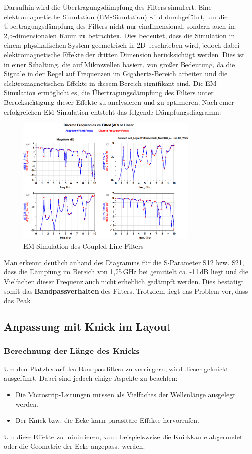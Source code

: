 Daraufhin wird die Übertragungsdämpfung des Filters simuliert. Eine elektromagnetische Simulation (EM-Simulation) wird durchgeführt, um die Übertragungsdämpfung des Filters nicht nur eindimensional, sondern auch im 2,5-dimensionalen Raum zu betrachten. 
Dies bedeutet, dass die Simulation in einem physikalischen System geometrisch in 2D beschrieben wird, jedoch dabei elektromagnetische Effekte der dritten Dimension berücksichtigt werden. 
Dies ist in einer Schaltung, die auf Mikrowellen basiert, von großer Bedeutung, da die Signale in der Regel auf Frequenzen im Gigahertz-Bereich arbeiten und die elektromagnetischen Effekte in diesem Bereich signifikant sind. 
Die EM-Simulation ermöglicht es, die Übertragungsdämpfung des Filters unter Berücksichtigung dieser Effekte zu analysieren und zu optimieren.
Nach einer erfolgreichen EM-Simulation entsteht das folgende Dämpfungsdiagramm:
\begin{figure}[H]
    \centering
    \includegraphics[width=0.8\textwidth]{Pictures/EMSimulationohneKnick.png}
    \caption{EM-Simulation des Coupled-Line-Filters}
\end{figure}

Man erkennt deutlich anhand des Diagramms für die S-Parameter S12 bzw. S21, dass die Dämpfung im Bereich von 1,25\,GHz bei gemittelt ca. -11\,dB liegt und die Vielfachen dieser Frequenz auch nicht erheblich gedämpft werden. Dies bestätigt somit das \textbf{Bandpassverhalten} des Filters.
Trotzdem liegt das Problem vor, dass das Peak 
\subsection{Anpassung mit Knick im Layout}
\subsubsection{Berechnung der Länge des Knicks}
Um den Platzbedarf des Bandpassfilters zu verringern, wird dieser geknickt ausgeführt. Dabei sind jedoch einige Aspekte zu beachten:
\begin{itemize}
    \item Die Microstrip-Leitungen müssen als Vielfaches der Wellenlänge ausgelegt werden.
    \item Der Knick bzw. die Ecke kann parasitäre Effekte hervorrufen.
\end{itemize}
Um diese Effekte zu minimieren, kann beispielsweise die Knickkante abgerundet oder die Geometrie der Ecke angepasst werden.

